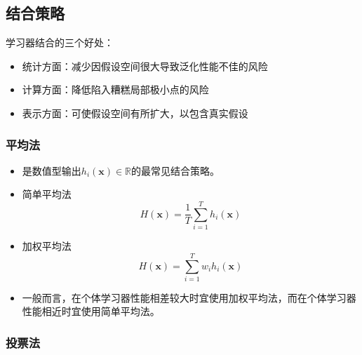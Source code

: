 \documentclass{ctexart}
\begin{document}
			 	\subsection{结合策略}
			 		学习器结合的三个好处：\begin{itemize}
			 			\item 统计方面：减少因假设空间很大导致泛化性能不佳的风险
			 			\item 计算方面：降低陷入糟糕局部极小点的风险
			 			\item 表示方面：可使假设空间有所扩大，以包含真实假设
			 		\end{itemize}
		 			\subsubsection{平均法}
		 				\begin{itemize}
		 					\item 是数值型输出$h_i(\bm{x})\in\mathbb{R}$的最常见结合策略。
		 					\item 简单平均法\[H(\bm{x})=\frac{1}{T}\sum_{i=1}^{T}h_i(\bm{x})\]
		 					\item 加权平均法\[H(\bm{x})=\sum_{i=1}^{T}w_ih_i(\bm{x})\]
		 					\item 一般而言，在个体学习器性能相差较大时宜使用加权平均法，而在个体学习器性能相近时宜使用简单平均法。
		 				\end{itemize}
	 				\subsubsection{投票法}
	 					
\end{document}
